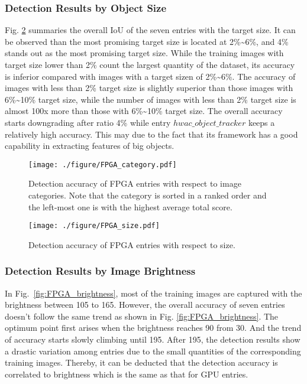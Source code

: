 \documentclass[10pt,journal,compsoc]{IEEEtran}
\begin{document}
\subsubsection{Detection Results by Object Size}\label{fpga_size}
Fig. \ref{fig:FPGA_size} summaries the overall IoU of the seven entries with the target size.
It can be observed than the most promising target size is located at 2\%\~{}6\%, and 4\% stands out as the most promising target size.
While the training images with target size lower than 2\% count the largest quantity of the dataset, its accuracy is inferior compared with images with a target sizen of 2\%\~{}6\%.
The accuracy of images with less than 2\% target size is slightly superior than those images with 6\%\~{}10\% target size, while the number of images with less than 2\% target size is almost 100x more than those with 6\%\~{}10\% target size.
The overall accuracy starts downgrading after ratio 4\% while entry $hwac\_object\_tracker$ keeps a relatively high accuracy.
This may due to the fact that its framework has a good capability in extracting features of big objects.

\begin{figure}%
\centering
  \texttt{[image: ./figure/FPGA\_category.pdf]}
    \caption{Detection accuracy of FPGA entries with respect to image categories. Note that the category is sorted in a ranked order and the left-most one is with the highest average total score.}
  \label{fig:FPGA_by_class}
\end{figure}
\begin{figure}%
\centering
  \texttt{[image: ./figure/FPGA\_size.pdf]}
  \caption{Detection accuracy of FPGA entries with respect to size.}
  \label{fig:FPGA_size}
\end{figure}

\subsubsection{Detection Results by Image Brightness}\label{fpga_brightness}
In Fig.~\ref{fig:FPGA_brightness}, most of the training images are captured with the brightness between 105 to 165.
However, the overall accuracy of seven entries doesn't follow the same trend as shown in Fig. \ref{fig:FPGA_brightness}.
The optimum point first arises when the brightness reaches 90 from 30.
And the trend of accuracy starts slowly climbing until 195.
After 195, the detection results show a drastic variation among entries due to the small quantities of the corresponding training images.
Thereby, it can be deducted that the detection accuracy is correlated to brightness which is the same as that for GPU entries.
\end{document}
